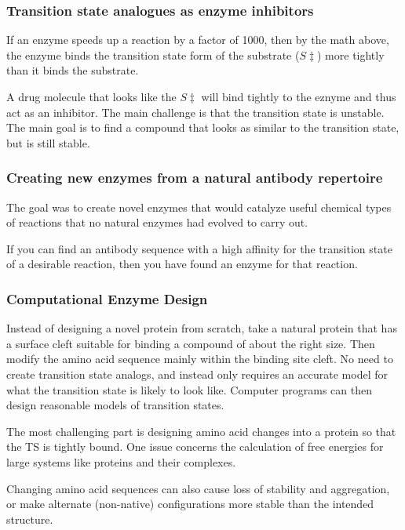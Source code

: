 \documentclass[12pt, letterpaper]{article}
\begin{document}
\subsubsection*{Transition state analogues as enzyme inhibitors}
If an enzyme speeds up a reaction by a factor of 1000, then by the math above, the enzyme binds the transition state form of the substrate ($S\ddagger$) 
more tightly than it binds the substrate. 

A drug molecule that looks like the $S\ddagger$ will bind tightly to the eznyme and thus act as an inhibitor. The main challenge is that the transition state is unstable. 
The main goal is to find a compound that looks as similar to the transition state, but is still stable. 

\subsubsection*{Creating new enzymes from a natural antibody repertoire}
The goal was to create novel enzymes that would catalyze useful chemical types of reactions that no natural enzymes had evolved to carry out. 

If you can find an antibody sequence with a high affinity for the transition state of a desirable reaction, then you have found an enzyme for that reaction. 

\subsubsection*{Computational Enzyme Design}
Instead of designing a novel protein from scratch, take a natural protein that has a surface cleft suitable for binding a compound of about the right size. 
Then modify the amino acid sequence mainly within the binding site cleft. No need to create transition state analogs, and instead only requires an accurate model 
for what the transition state is likely to look like. Computer programs can then design reasonable models of transition states. 

The most challenging part is designing amino acid changes into a protein so that the TS is tightly bound. One issue concerns the calculation of free energies for large systems like 
proteins and their complexes. 

Changing amino acid sequences can also cause loss of stability and aggregation, or make alternate (non-native) configurations more stable than the intended structure. 

\newpage
\end{document}
